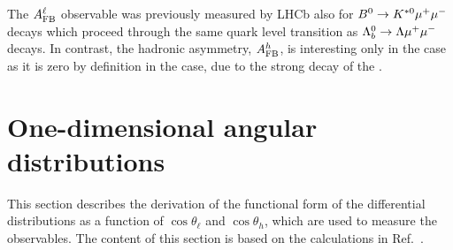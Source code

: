 The $A_{\rm FB}^\ell$ observable was previously measured by LHCb also for $B^0\rightarrow K^{*0}\mu^+\mu^-$ decays
which proceed through the same quark level transition as $\Lambda^0_b\rightarrow\Lambda\mu^+\mu^-$ decays. In contrast, the hadronic
asymmetry, $A_{\rm FB}^h$, is interesting only in the \Lb case as it is zero by definition
in the \Bz case, due to the strong decay of the \Kstarz.

\section{One-dimensional angular distributions}

This section describes the derivation of the functional form of the differential distributions 
as a function of $\cos\theta_\ell$ and $\cos\theta_h$, which are used to measure
the observables. The content of this section is based on the calculations in Ref.~\cite{Gutsche:2013pp}. 


